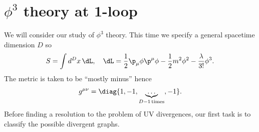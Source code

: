 \chapter{\texorpdfstring{$\phi^3$}{phi3} theory at 1-loop}
We will consider our study of $\phi^3$ theory. This time we specify a general spacetime dimension $D$ so
\begin{equation}
    S = \int d^Dx\,\dL,\quad \dL = \frac{1}{2}\p_\mu\phi\p^\mu\phi - \frac{1}{2}m^2\phi^2 - \frac{\lambda}{3!}\phi^3.
\end{equation}
The metric is taken to be ``mostly minus'' hence
\begin{equation}
    g^{\mu\nu} = \diag{1,-1,\underbrace{\dots}_{D - 1\,\mathrm{times}},-1}.
\end{equation}
Before finding a resolution to the problem of UV divergences, our first task is to classify the possible divergent graphs. 

